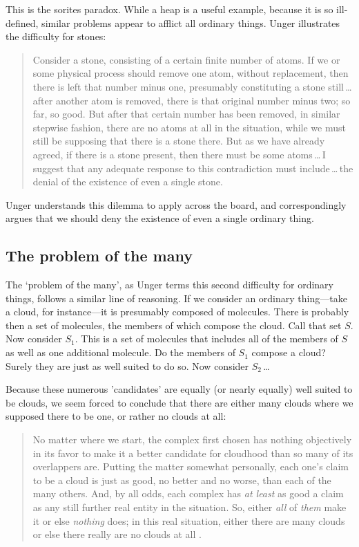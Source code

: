 \documentclass[11pt]{standalone} \newif\ifstandlone \standalonetrue
\newenvironment{squote}{%
	\begin{quote}\begin{singlespace}%
	}{%
	\end{singlespace}\end{quote}}
\begin{document}
\begin{spacing}{1.5}
This is the sorites paradox.  While a heap is a useful example,
because it is so ill-defined, similar problems appear to afflict all
ordinary things.  Unger illustrates the difficulty for stones:

\begin{squote}
Consider a stone, consisting of a certain finite number of atoms.  If
we or some physical process should remove one atom, without
replacement, then there is left that number minus one, presumably
constituting a stone still\,\ldots\,after another atom is removed,
there is that original number minus two; so far, so good.  But after
that certain number has been removed, in similar stepwise fashion,
there are no atoms at all in the situation, while we must still be
supposing that there is a stone there.  But as we have already agreed,
if there is a stone present, then there must be some atoms\,\ldots\,I
suggest that any adequate response to this contradiction must
include\,\ldots\,the denial of the existence of even a single
stone.~\citep[121--122]{unger1979}
\end{squote}
Unger understands this dilemma to apply across the board, and
correspondingly argues that we should deny the existence of even a
single ordinary thing.

\subsection{The problem of the many}
The `problem of the many', as Unger terms this second difficulty for
ordinary things, follows a similar line of reasoning.  If we consider
an ordinary thing---take a cloud, for instance---it is presumably
composed of molecules.  There is probably then a set of molecules, the
members of which compose the cloud.  Call that set $S$.  Now consider
$S_1$.  This is a set of molecules that includes all of the members of
$S$ as well as one additional molecule.  Do the members of $S_1$
compose a cloud?  Surely they are just as well suited to do so.  Now
consider $S_2$\,\ldots

Because these numerous 'candidates' are equally (or nearly equally)
well suited to be clouds, we seem forced to conclude that there are
either many clouds where we supposed there to be one, or rather no
clouds at all:

\begin{squote}
No matter where we start, the complex first chosen has nothing
objectively in its favor to make it a better candidate for cloudhood
than so many of its overlappers are.  Putting the matter somewhat
personally, each one's claim to be a cloud is just as good, no better
and no worse, than each of the many others.  And, by all odds, each
complex has \emph{at least} as good a claim as any still further real
entity in the situation.  So, either \emph{all} of \emph{them} make it
or else \emph{nothing} does; in this real situation, either there are
many clouds or else there really are no clouds at all
\citep[415--??]{unger1980a}.
\end{squote}


\end{spacing}
\end{document}
